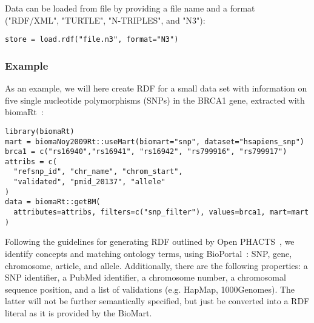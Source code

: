 \documentclass[12pt]{article}
\begin{document}
Data can be loaded from file by providing a file name and a format ("RDF/XML", "TURTLE",
"N-TRIPLES", and "N3"):

\begin{footnotesize}
\begin{verbatim}
store = load.rdf("file.n3", format="N3")
\end{verbatim}
\end{footnotesize}

\subsubsection{Example}

As an example, we will here create RDF for a small data set with information on five single nucleotide
polymorphisms (SNPs) in the BRCA1 gene, extracted with biomaRt~\cite{Durinck2005}:

\begin{footnotesize}
\begin{verbatim}
library(biomaRt)
mart = biomaNoy2009Rt::useMart(biomart="snp", dataset="hsapiens_snp")
brca1 = c("rs16940","rs16941", "rs16942", "rs799916", "rs799917")
attribs = c(
  "refsnp_id", "chr_name", "chrom_start",
  "validated", "pmid_20137", "allele"
)
data = biomaRt::getBM(
  attributes=attribs, filters=c("snp_filter"), values=brca1, mart=mart
)
\end{verbatim}
\end{footnotesize}

Following the guidelines for generating RDF outlined by Open PHACTS~\cite{Haupt2013,Williams2012}, we identify concepts
and matching ontology terms, using BioPortal~\cite{Noy2009}: SNP, gene, chromosome,
article, and allele. Additionally, there are the following properties: a SNP identifier, a PubMed identifier,
a chromosome number, a chromosomal sequence position, and a list of validations (e.g. HapMap, 1000Genomes).
The latter will not be further semantically specified, but just be converted into a RDF literal as it is
provided by the BioMart.
\end{document}
